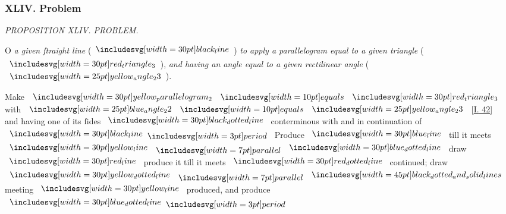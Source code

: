 \documentclass[11pt,preview]{standalone}
\begin{document}
\subsubsection{XLIV. Problem}

\begin{minipage}[t]{0.54\textwidth}
    \begin{center}
        \textit{PROPOSITION XLIV. PROBLEM.}\label{book1pr44} \\
    \end{center}

    \hfill

    \begin{center}
        \raggedright \lettrine[lines=3, loversize=1, nindent=0pt]{}{}O \textit{a given ſtraight line} (\hspace{-1ex}$\blackline$\hspace{-1ex}) \textit{to apply a parallelogram equal to a given triangle} (\hspace{-1ex}$\img[0][0][30]{red_triangle_3}$\hspace{-1ex}), \textit{and having an angle equal to a given rectilinear angle} (\hspace{-1ex}$\img{yellow_angle_23}$\hspace{-1ex}).
    \end{center}
\end{minipage}%
\hfill
\begin{minipage}[t]{0.43\textwidth}
    \vspace{20pt}
    
\end{minipage}

\hfill

{\vspace{1ex}\begin{center}
        Make $\img[0][0][30]{yellow_parallelogram_2} \bequals \img[0][0][30]{red_triangle_3}$ with $\img{blue_angle_22} \bequals \img{yellow_angle_23}$ [\hyperref[book1pr42]{\textsc{I.} 42}]\\
        and having one of its ſides $\dottedblackline$ conterminous with and in continuation of $\blackline \bperiod$ Produce $\blueline$ till it meets $\yellowline \bparallel \dottedblueline$ draw $\redline$ produce it till it meets $\dottedredline$ continued; draw $\dottedyellowline \bparallel \bimg{black_dotted_and_solid_lines}$ meeting $\yellowline$ produced, and produce $\dottedblueline \bperiod$
    \end{center}}
\end{document}
